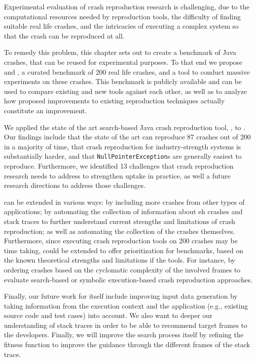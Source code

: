 Experimental evaluation of crash reproduction research is challenging, due to the computational resources needed by reproduction tools, the difficulty of finding suitable real life crashes, and the intricacies of executing a complex system so that the crash can be reproduced at all.

To remedy this problem, this chapter sets out to create a benchmark of Java crashes, that can be reused for experimental purposes.
To that end we propose \crashpack and \exrunner, a curated benchmark of 200 real life crashes, and a tool to conduct massive experiments on these crashes.
This benchmark is publicly available and can be used to compare existing and new tools against each other, as well as to analyze how proposed improvements to existing reproduction techniques actually constitute an improvement.

We applied the state of the art search-based Java crash reproduction tool, \evocrash, to \crashpack. Our findings include that the state of the art can reproduce 87 crashes out of 200 in a majority of time, that crash reproduction for industry-strength systems is substantially harder, and that \texttt{NullPointerException}s are generally easiest to reproduce. Furthermore, we identified 13 challenges that crash reproduction research needs to address to strengthen uptake in practice, as well a future research directions to address those challenges.

\crashpack  can be extended in various ways: by including more crashes from other types of applications; by automating the collection of information about eh crashes and stack traces to further understand current strengths and limitations of crash reproduction; as well as automating the collection of the crashes themselves. Furthermore, since executing crash reproduction tools on 200 crashes may be time taking, \crashpack could be extended to offer prioritization for benchmarks, based on the known theoretical strengths and limitations if the tools. For instance, by ordering crashes based on the cyclomatic complexity of the involved frames to evaluate search-based or symbolic execution-based crash reproduction approaches. 

Finally, our future work for \evocrash itself include improving input data generation by taking information from the execution context and the application (e.g., existing source code and test cases) into account. We also want to deeper our understanding of stack traces in order to be able to recommend target frames to the developers. Finally, we will improve the search process itself by refining the fitness function to improve the guidance through the different frames of the stack trace.


